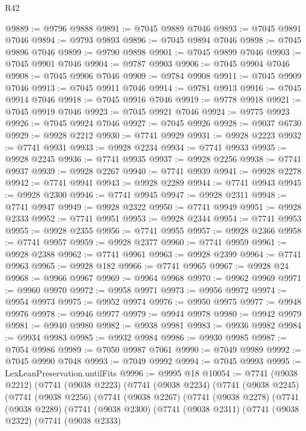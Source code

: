 \begin{lexlean}{R42}
\begin{coremodule}
{@9889 := @9796 @9888
@9891 := @7045 @9889 @7046
@9893 := @7045 @9891 @7046
@9894 := @9793 @9893
@9896 := @7045 @9894 @7046
@9898 := @7045 @9896 @7046
@9899 := @9790 @9898
@9901 := @7045 @9899 @7046
@9903 := @7045 @9901 @7046
@9904 := @9787 @9903
@9906 := @7045 @9904 @7046
@9908 := @7045 @9906 @7046
@9909 := @9784 @9908
@9911 := @7045 @9909 @7046
@9913 := @7045 @9911 @7046
@9914 := @9781 @9913
@9916 := @7045 @9914 @7046
@9918 := @7045 @9916 @7046
@9919 := @9778 @9918
@9921 := @7045 @9919 @7046
@9923 := @7045 @9921 @7046
@9924 := @9775 @9923
@9926 := @7045 @9924 @7046
@9927 := @7045 @9926
@9928 := @9037 @6730
@9929 := @9928 @2212
@9930 := @7741 @9929
@9931 := @9928 @2223
@9932 := @7741 @9931
@9933 := @9928 @2234
@9934 := @7741 @9933
@9935 := @9928 @2245
@9936 := @7741 @9935
@9937 := @9928 @2256
@9938 := @7741 @9937
@9939 := @9928 @2267
@9940 := @7741 @9939
@9941 := @9928 @2278
@9942 := @7741 @9941
@9943 := @9928 @2289
@9944 := @7741 @9943
@9945 := @9928 @2300
@9946 := @7741 @9945
@9947 := @9928 @2311
@9948 := @7741 @9947
@9949 := @9928 @2322
@9950 := @7741 @9949
@9951 := @9928 @2333
@9952 := @7741 @9951
@9953 := @9928 @2344
@9954 := @7741 @9953
@9955 := @9928 @2355
@9956 := @7741 @9955
@9957 := @9928 @2366
@9958 := @7741 @9957
@9959 := @9928 @2377
@9960 := @7741 @9959
@9961 := @9928 @2388
@9962 := @7741 @9961
@9963 := @9928 @2399
@9964 := @7741 @9963
@9965 := @9928 @182
@9966 := @7741 @9965
@9967 := @9928 @24
@9968 := @9966 @9967
@9969 := @9964 @9968
@9970 := @9962 @9969
@9971 := @9960 @9970
@9972 := @9958 @9971
@9973 := @9956 @9972
@9974 := @9954 @9973
@9975 := @9952 @9974
@9976 := @9950 @9975
@9977 := @9948 @9976
@9978 := @9946 @9977
@9979 := @9944 @9978
@9980 := @9942 @9979
@9981 := @9940 @9980
@9982 := @9938 @9981
@9983 := @9936 @9982
@9984 := @9934 @9983
@9985 := @9932 @9984
@9986 := @9930 @9985
@9987 := @7054 @9986
@9989 := @7050 @9987 @7061
@9990 := @7049 @9989
@9992 := @7045 @9990 @7048
@9993 := @7049 @9992
@9994 := @7045 @9993
@9995 := LexLeanPreservation.untilFits
@9996 := @9995 @18
@10054 := @7741
    (@9038 @2212)
    (@7741
      (@9038 @2223)
      (@7741
        (@9038 @2234)
        (@7741
          (@9038 @2245)
          (@7741
            (@9038 @2256)
            (@7741
              (@9038 @2267)
              (@7741
                (@9038 @2278)
                (@7741
                  (@9038 @2289)
                  (@7741
                    (@9038 @2300)
                    (@7741
                      (@9038 @2311)
                      (@7741
                        (@9038 @2322)
                        (@7741
                          (@9038 @2333)
}
\end{coremodule}
\end{lexlean}
